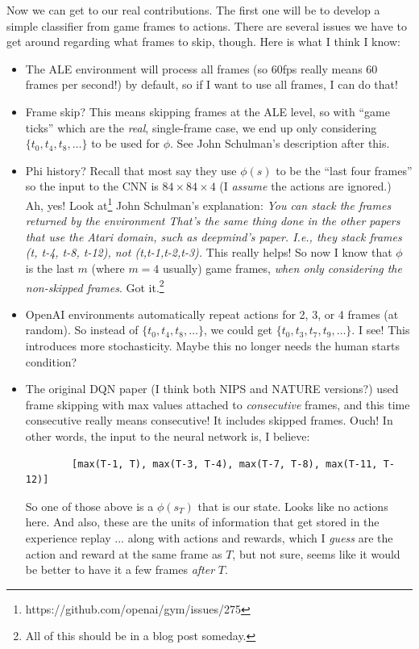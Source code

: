 \documentclass[letterpaper, 10pt, conference]{ieeeconf}
\begin{document}
Now we can get to our real contributions. The first one will be to
    develop a simple classifier from game frames to actions. There are several
    issues we have to get around regarding what frames to skip, though. Here is
    what I think I know:

    \begin{itemize}
        \item The ALE environment will process all frames (so 60fps really means
        60 frames per second!) by default, so if I want to use all frames, I can
        do that!

        \item Frame skip? This means skipping frames at the ALE level, so with
        ``game ticks'' which are the \emph{real}, single-frame case, we end up
        only considering $\{t_0, t_4, t_8, \ldots \}$ to be used for $\phi$. See
        John Schulman's description after this.

        \item Phi history? Recall that most say they use $\phi(s)$ to be the
        ``last four frames'' so the input to the CNN is $84 \times 84 \times 4$
        (I \emph{assume} the actions are ignored.) Ah, yes! Look
        at\footnote{https://github.com/openai/gym/issues/275} John
        Schulman's explanation: \emph{You can stack the frames returned by the
        environment That's the same thing done in the other papers that use the
        Atari domain, such as deepmind's paper.  I.e., they stack frames (t,
        t-4, t-8, t-12), not (t,t-1,t-2,t-3).} This really helps! So now I know
        that $\phi$ is the last $m$ (where $m=4$ usually) game frames,
        \emph{when only considering the non-skipped frames}. Got
        it.\footnote{All of this should be in a blog post someday.}

        \item OpenAI environments automatically repeat actions for 2, 3, or 4
        frames (at random). So instead of $\{t_0,t_4,t_8,\ldots\}$, we could get
        $\{t_0,t_3,t_7,t_9,\ldots\}$. I see! This introduces more stochasticity.
        Maybe this no longer needs the human starts condition?

        \item The original DQN paper (I think both NIPS and NATURE versions?)
        used frame skipping with max values attached to \emph{consecutive}
        frames, and this time consecutive really means consecutive! It includes
        skipped frames. Ouch! In other words, the input to the neural network
        is, I believe:
        \begin{verbatim}
        [max(T-1, T), max(T-3, T-4), max(T-7, T-8), max(T-11, T-12)]
        \end{verbatim}
        So one of those above is a $\phi(s_T)$ that is our state. Looks like no
        actions here. And also, these are the units of information that get
        stored in the experience replay ... along with actions and rewards,
        which I \emph{guess} are the action and reward at the same frame as $T$,
        but not sure, seems like it would be better to have it a few frames
        \emph{after} $T$.


\end{itemize}
\end{document}

